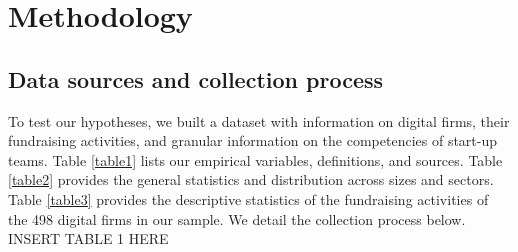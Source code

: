 \documentclass[12pt]{article}
\begin{document}
\section{Methodology}

\subsection{Data sources and collection process}

To test our hypotheses, we built a dataset with information on digital firms, their fundraising activities, and granular information on the competencies of start-up teams. Table \ref{table1} lists our empirical variables, definitions, and sources. Table \ref{table2} provides the general statistics and distribution across sizes and sectors. Table \ref{table3} provides the descriptive statistics of the fundraising activities of the 498 digital firms in our sample. We detail the collection process below. \\

INSERT TABLE 1 HERE \\
\end{document}
